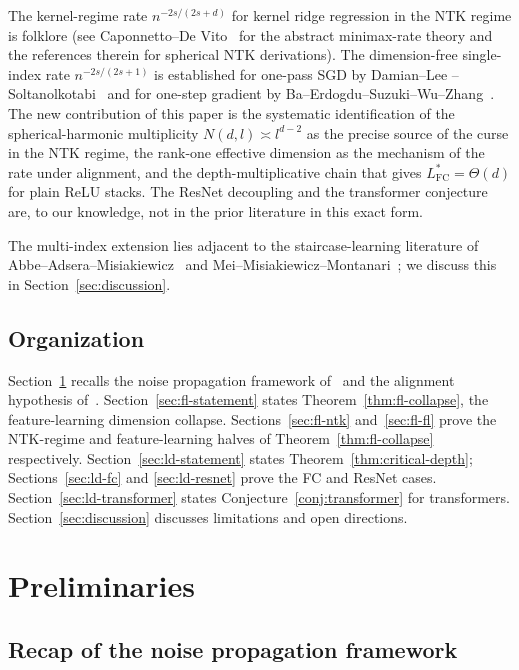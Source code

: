 \documentclass[12pt]{amsart}
\theoremstyle{definition}
\theoremstyle{remark}
\begin{document}
The kernel-regime rate $n^{-2s/(2s+d)}$ for kernel ridge regression in
the NTK regime is folklore (see Caponnetto--De Vito~\cite{capDeVito2007}
for the abstract minimax-rate theory and the references therein for
spherical NTK derivations). The dimension-free single-index rate
$n^{-2s/(2s+1)}$ is established for one-pass SGD by Damian--Lee
--Soltanolkotabi~\cite{DLS2022} and for one-step gradient by
Ba--Erdogdu--Suzuki--Wu--Zhang~\cite{ba2022mei}. The new contribution
of this paper is the systematic identification of the spherical-harmonic
multiplicity $N(d,l) \asymp l^{d-2}$ as the precise source of the curse
in the NTK regime, the rank-one effective dimension as the mechanism
of the rate under alignment, and the depth-multiplicative chain that gives
$L^{*}_{\mathrm{FC}} = \Theta(d)$ for plain ReLU stacks. The
ResNet decoupling and the transformer conjecture are, to our knowledge,
not in the prior literature in this exact form.

The multi-index extension lies adjacent to the staircase-learning
literature of Abbe--Adsera--Misiakiewicz~\cite{abbe2022} and
Mei--Misiakiewicz--Montanari~\cite{MMM2022}; we discuss this in
Section~\ref{sec:discussion}.

\subsection{Organization}

Section~\ref{sec:prelim} recalls the noise propagation framework
of~\cite{paperA} and the alignment hypothesis of~\cite{paperB}.
Section~\ref{sec:fl-statement} states Theorem~\ref{thm:fl-collapse}, the
feature-learning dimension collapse. Sections~\ref{sec:fl-ntk}
and~\ref{sec:fl-fl} prove the NTK-regime and feature-learning halves of
Theorem~\ref{thm:fl-collapse} respectively. Section~\ref{sec:ld-statement}
states Theorem~\ref{thm:critical-depth}; Sections~\ref{sec:ld-fc} and
\ref{sec:ld-resnet} prove the FC and ResNet cases.
Section~\ref{sec:ld-transformer} states Conjecture~\ref{conj:transformer}
for transformers. Section~\ref{sec:discussion} discusses limitations and
open directions.

\section{Preliminaries}\label{sec:prelim}

\subsection{Recap of the noise propagation framework}
\end{document}
